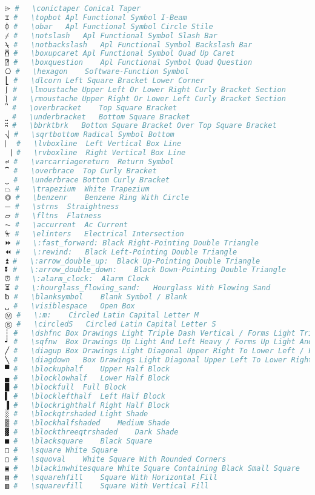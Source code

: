 \begin{lstlisting}[language=Julia, style=julia, linewidth=\textwidth]
⌲ #   \conictaper Conical Taper
⌶ #   \topbot Apl Functional Symbol I-Beam
⌽ #   \obar   Apl Functional Symbol Circle Stile
⌿ #   \notslash   Apl Functional Symbol Slash Bar
⍀ #   \notbackslash   Apl Functional Symbol Backslash Bar
⍓ #   \boxupcaret Apl Functional Symbol Quad Up Caret
⍰ #   \boxquestion    Apl Functional Symbol Quad Question
⎔ #   \hexagon    Software-Function Symbol
⎣ #   \dlcorn Left Square Bracket Lower Corner
⎰ #   \lmoustache Upper Left Or Lower Right Curly Bracket Section
⎱ #   \rmoustache Upper Right Or Lower Left Curly Bracket Section
⎴ #   \overbracket    Top Square Bracket
⎵ #   \underbracket   Bottom Square Bracket
⎶ #   \bbrktbrk   Bottom Square Bracket Over Top Square Bracket
⎷ #   \sqrtbottom Radical Symbol Bottom
⎸ #   \lvboxline  Left Vertical Box Line
⎹ #   \rvboxline  Right Vertical Box Line
⏎ #   \varcarriagereturn  Return Symbol
⏞ #   \overbrace  Top Curly Bracket
⏟ #   \underbrace Bottom Curly Bracket
⏢ #   \trapezium  White Trapezium
⏣ #   \benzenr    Benzene Ring With Circle
⏤ #   \strns  Straightness
⏥ #   \fltns  Flatness
⏦ #   \accurrent  Ac Current
⏧ #   \elinters   Electrical Intersection
⏩ #   \:fast_forward: Black Right-Pointing Double Triangle
⏪ #   \:rewind:   Black Left-Pointing Double Triangle
⏫ #   \:arrow_double_up:  Black Up-Pointing Double Triangle
⏬ #   \:arrow_double_down:    Black Down-Pointing Double Triangle
⏰ #   \:alarm_clock:  Alarm Clock
⏳ #   \:hourglass_flowing_sand:   Hourglass With Flowing Sand
␢ #   \blanksymbol    Blank Symbol / Blank
␣ #   \visiblespace   Open Box
Ⓜ #   \:m:    Circled Latin Capital Letter M
Ⓢ #   \circledS   Circled Latin Capital Letter S
┆ #   \dshfnc Box Drawings Light Triple Dash Vertical / Forms Light Triple Dash Vertical
┙ #   \sqfnw  Box Drawings Up Light And Left Heavy / Forms Up Light And Left Heavy
╱ #   \diagup Box Drawings Light Diagonal Upper Right To Lower Left / Forms Light Diagonal Upper Right To Lower Left
╲ #   \diagdown   Box Drawings Light Diagonal Upper Left To Lower Right / Forms Light Diagonal Upper Left To Lower Right
▀ #   \blockuphalf    Upper Half Block
▄ #   \blocklowhalf   Lower Half Block
█ #   \blockfull  Full Block
▌ #   \blocklefthalf  Left Half Block
▐ #   \blockrighthalf Right Half Block
░ #   \blockqtrshaded Light Shade
▒ #   \blockhalfshaded    Medium Shade
▓ #   \blockthreeqtrshaded    Dark Shade
■ #   \blacksquare    Black Square
□ #   \square White Square
▢ #   \squoval    White Square With Rounded Corners
▣ #   \blackinwhitesquare White Square Containing Black Small Square
▤ #   \squarehfill    Square With Horizontal Fill
▥ #   \squarevfill    Square With Vertical Fill

\end{lstlisting}
